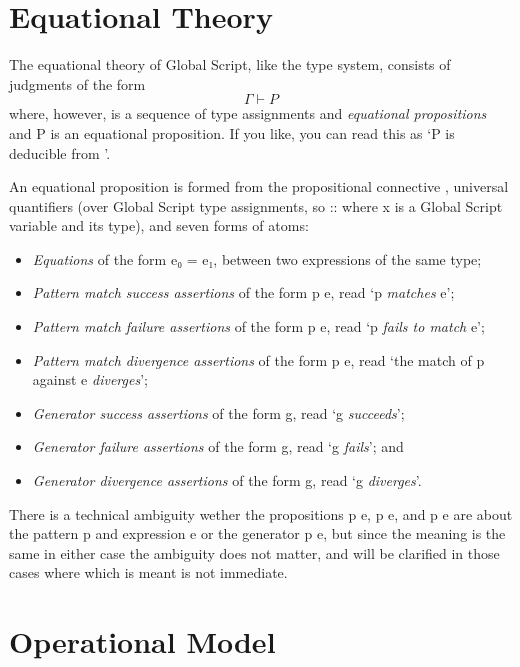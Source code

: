 \documentclass{report}
\newcommand\sequent\vdash
\newcommand\match\propto
\newcommand\defn[1]{\emph{#1}}
\begin{document}
\section{Equational Theory}

The equational theory of Global Script, like the type system, consists of judgments of the form
\begin{equation}
    \Gamma \sequent P
\end{equation}
where, however, \<\Gamma\> is a sequence of type assignments and \emph{equational propositions} and \<P\> is an equational proposition.
If you like, you can read this as `\<P\> is deducible from \<\Gamma\>'.

An equational proposition is formed from the propositional connective \<\land\>,
universal quantifiers \<\forall\>
(over Global Script type assignments, so \<\forall {} :: \tau\> where \<x\> is a Global Script variable and \<\tau\> its type),
and seven forms of atoms:
\begin{itemize}
    \item \defn{Equations} of the form \<e₀ = e₁\>, between two expressions of the same type;
    \item \defn{Pattern match success assertions} of the form \<p \match e\>, read `\<p\> \defn{matches} \<e\>';
    \item \defn{Pattern match failure  assertions} of the form \<p \match e\fails\>, read `\<p\> \defn{fails to match} \<e\>';
    \item \defn{Pattern match divergence assertions} of the form \<p \match e\diverges\>, read `the match of \<p\> against \<e\> \defn{diverges}';
    \item \defn{Generator success assertions} of the form \<g\>, read `\<g\> \defn{succeeds}';
    \item \defn{Generator failure assertions} of the form \<g\fails\>, read `\<g\> \defn{fails}'; and
    \item \defn{Generator divergence assertions} of the form \<g\diverges\>, read `\<g\> \defn{diverges}'.
\end{itemize}
There is a technical ambiguity wether the propositions \<p \match e\>, \<p \match e\fails\>, and \<p \match e\diverges\>
are about the pattern \<p\> and expression \<e\> or the generator \<p \match e\>,
but since the meaning is the same in either case the ambiguity does not matter,
and will be clarified in those cases where which is meant is not immediate.

\section{Operational Model}
\end{document}
